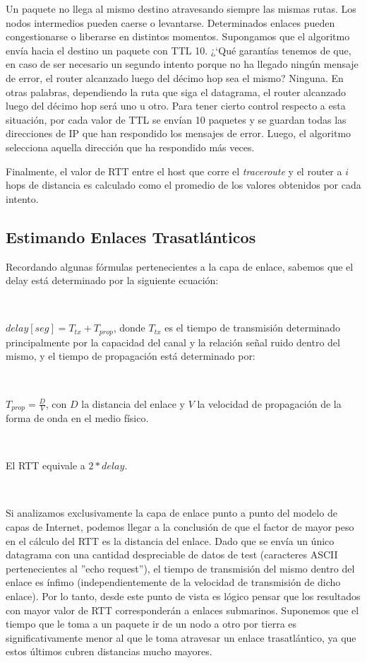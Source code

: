 Un paquete no llega al mismo destino atravesando siempre las mismas rutas. Los nodos intermedios pueden
caerse o levantarse. Determinados enlaces pueden congestionarse o liberarse en distintos momentos.
Supongamos que el algoritmo env\'ia hacia el destino un paquete con TTL 10. ¿`Qu\'e garant\'ias tenemos de que,
en caso de ser necesario un segundo intento porque no ha llegado ning\'un mensaje de error, el router
alcanzado luego del d\'ecimo hop sea el mismo? Ninguna. En otras palabras, dependiendo la ruta que siga
el datagrama, el router alcanzado luego del d\'ecimo hop ser\'a uno u otro.
Para tener cierto control respecto a esta situaci\'on, por cada valor de TTL se env\'ian 10 paquetes y
se guardan todas las direcciones de IP que han respondido los mensajes de error.
Luego, el algoritmo selecciona aquella direcci\'on que ha respondido m\'as veces.

Finalmente, el valor de RTT entre el host que corre el \emph{traceroute} y el router a $i$ hops de
distancia es calculado como el promedio de los valores obtenidos por cada intento.


\subsection{Estimando Enlaces Trasatl\'anticos}

Recordando algunas f\'ormulas pertenecientes a la capa de enlace, sabemos que el delay est\'a determinado
por la siguiente ecuaci\'on:

~

$delay[seg] = T_{tx} + T_{prop}$, donde $T_{tx}$ es el tiempo de transmisi\'on determinado principalmente
por la capacidad del canal y la relaci\'on se\~nal ruido dentro del mismo, y el tiempo de propagaci\'on
est\'a determinado por:

~

$T_{prop} = \frac{D}{V}$, con $D$ la distancia del enlace y $V$ la velocidad de propagaci\'on de la forma
de onda en el medio f\'isico.

~

El RTT equivale a $2*delay$.

~

Si analizamos exclusivamente la capa de enlace punto a punto del modelo de capas de Internet, podemos
llegar a la conclusi\'on de que el factor de mayor peso en el c\'alculo del RTT es la distancia del enlace.
Dado que se env\'ia un \'unico datagrama con una cantidad despreciable de datos de test (caracteres
ASCII pertenecientes al ''echo request''), el tiempo de transmisi\'on del mismo dentro del enlace es
\'infimo (independientemente de la velocidad de transmisi\'on de dicho enlace). Por lo tanto, desde este
punto de vista es l\'ogico pensar que los resultados con mayor valor de RTT corresponder\'an a enlaces
submarinos. Suponemos que el tiempo que le toma a un paquete ir de un nodo a otro
por tierra es significativamente menor al que le toma atravesar un
enlace trasatl\'antico, ya que estos \'ultimos cubren distancias mucho mayores.

